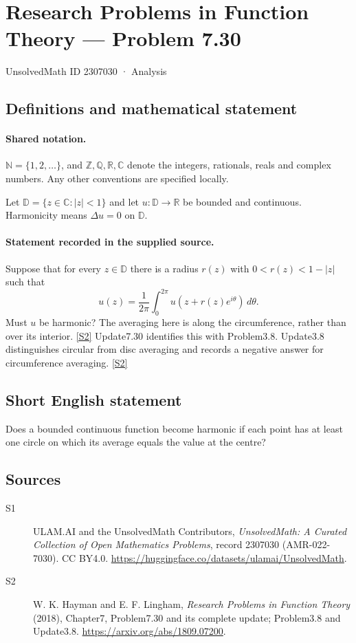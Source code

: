 \documentclass[11pt]{article}
\newcommand{\sref}[2]{\hyperlink{source:#1:#2}{[S#2]}}
\begin{document}
\setcounter{section}{2307029}
\section{Research Problems in Function Theory — Problem 7.30}\label{2307030}
{\small\sffamily UnsolvedMath ID 2307030 · Analysis}
\subsection{Definitions and mathematical statement}

\paragraph{Shared notation.}$\mathbb N=\{1,2,\ldots\}$, and $\mathbb Z,\mathbb Q,\mathbb R,\mathbb C$ denote the integers, rationals, reals and complex numbers. Any other conventions are specified locally.


Let $\mathbb D=\{z\in\mathbb C:|z|<1\}$ and let $u:\mathbb D\to\mathbb R$ be bounded and continuous. Harmonicity means $\Delta u=0$ on $\mathbb D$.

\paragraph{Statement recorded in the supplied source.}
Suppose that for every $z\in\mathbb D$ there is a radius $r(z)$ with $0<r(z)<1-|z|$ such that
\[u(z)=\frac1{2\pi}\int_0^{2\pi}u(z+r(z)e^{i\theta})\,d\theta.\]
Must $u$ be harmonic? The averaging here is along the circumference, rather than over its interior. \sref{2307030}{2}
Update7.30 identifies this with Problem3.8. Update3.8 distinguishes circular from disc averaging and records a negative answer for circumference averaging. \sref{2307030}{2}
\subsection{Short English statement}
Does a bounded continuous function become harmonic if each point has at least one circle on which its average equals the value at the centre?
\subsection{Sources}
\begin{description}
\item[\hypertarget{source:2307030:1}{S1}] ULAM.AI and the UnsolvedMath Contributors, \emph{UnsolvedMath: A Curated Collection of Open Mathematics Problems}, record 2307030 (AMR-022-7030). CC BY4.0. \url{https://huggingface.co/datasets/ulamai/UnsolvedMath}.
\item[\hypertarget{source:2307030:2}{S2}] W. K. Hayman and E. F. Lingham, \emph{Research Problems in Function Theory} (2018), Chapter7, Problem7.30 and its complete update; Problem3.8 and Update3.8. \url{https://arxiv.org/abs/1809.07200}.
\end{description}
\label{end:2307030}
\end{document}
